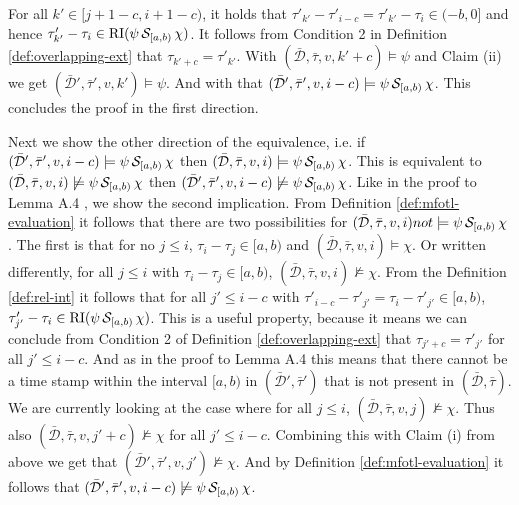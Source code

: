\begin{itemize}
        For all $k' \in [j+1-c, i+1-c)$, it holds that $\tau'_{k'} - \tau'_{i-c} = \tau'_{k'} - \tau_i \in (-b,0]$ and hence $\tau'_{k'} - \tau_i \in \operatorname{RI}(\psi \,\mathcal{S}_{[a,b)}\, \chi)$.
        It follows from Condition 2 in Definition \ref{def:overlapping-ext} that $\tau_{k'+c} = \tau'_{k'}$.
        With $(\bar{\mathcal{D}}, \bar{\tau}, v, k' + c) \models \psi$ and Claim (ii) we get $(\bar{\mathcal{D}}', \bar{\tau}', v, k') \models \psi$.
        And with that $(\bar{\mathcal{D}}', \bar{\tau}', v, i-c) \models \psi \,\mathcal{S}_{[a,b)}\, \chi$.
        This concludes the proof in the first direction.

        Next we show the other direction of the equivalence, i.e. if $(\bar{\mathcal{D}}', \bar{\tau}', v, i-c) \models \psi \,\mathcal{S}_{[a,b)}\, \chi$ then $(\bar{\mathcal{D}}, \bar{\tau}, v, i) \models \psi \,\mathcal{S}_{[a,b)}\, \chi$.
        This is equivalent to $(\bar{\mathcal{D}}, \bar{\tau}, v, i) \not\models \psi \,\mathcal{S}_{[a,b)}\, \chi$ then $(\bar{\mathcal{D}}', \bar{\tau}', v, i-c) \not\models \psi \,\mathcal{S}_{[a,b)}\, \chi$.
        Like in the proof to Lemma A.4 \cite{Basin2016}, we show the second implication.
        From Definition \ref{def:mfotl-evaluation} it follows that there are two possibilities for $(\bar{\mathcal{D}}, \bar{\tau}, v, i) not\models \psi \,\mathcal{S}_{[a,b)}\, \chi$.
        The first is that for no $j \leq i$, $\tau_i - \tau_j \in [a,b)$ and $(\bar{\mathcal{D}}, \bar{\tau}, v, i) \models \chi$.
        Or written differently, for all $j \leq i$ with $\tau_i - \tau_j \in [a,b)$, $(\bar{\mathcal{D}}, \bar{\tau}, v, i) \not\models \chi$.
        From the Definition \ref{def:rel-int} it follows that for all $j' \leq i-c$ with $\tau'_{i-c} - \tau'_{j'} = \tau_i - \tau'_{j'} \in [a,b)$, $\tau'_{j'} - \tau_i \in \operatorname{RI}(\psi \,\mathcal{S}_{[a,b)}\, \chi)$.
        This is a useful property, because it means we can conclude from Condition 2 of Definition \ref{def:overlapping-ext} that $\tau_{j'+c} = \tau'_{j'}$ for all $j' \leq i-c$.
        And as in the proof to Lemma A.4 \cite{Basin2016} this means that there cannot be a time stamp within the interval $[a,b)$ in $(\bar{\mathcal{D}}', \bar{\tau}')$ that is not present in $(\bar{\mathcal{D}}, \bar{\tau})$.
        We are currently looking at the case where for all $j \leq i$, $(\bar{\mathcal{D}}, \bar{\tau}, v, j) \not\models \chi$.
        Thus also $(\bar{\mathcal{D}}, \bar{\tau}, v, j'+c) \not\models \chi$ for all $j' \leq i-c$.
        Combining this with Claim (i) from above we get that $(\bar{\mathcal{D}}', \bar{\tau}', v, j') \not\models \chi$.
        And by Definition \ref{def:mfotl-evaluation} it follows that $(\bar{\mathcal{D}}', \bar{\tau}', v, i-c) \not\models \psi \,\mathcal{S}_{[a,b)}\, \chi$.


\end{itemize}
